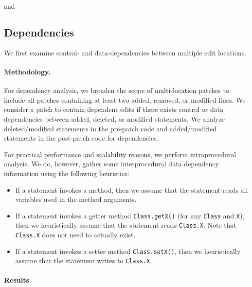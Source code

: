 \documentclass[sigconf, timestamp-false, anonymous=true]{acmart}
\begin{document}

and




\subsection{Dependencies}

We first examine control- and data-dependencies between multiple edit locations. 

\paragraph{Methodology.} 
For dependency analysis, we broaden the scope of multi-location patches to 
include all patches containing at least two added, removed, or modified lines.
We consider a patch to contain dependent edits if there exists 
control or data dependencies between added, deleted, or modified statements.
We analyze deleted/modified statements in the pre-patch code 
and added/modified statements in the post-patch code for dependencies.
  
For practical performance and scalability reasons, 
we perform intraprocedural analysis. 
We do, however, gather some interprocedural data dependency information 
using the following heuristics:
\begin{itemize}
	\item If a statement invokes a method, then we assume that
	the statement reads all variables used in the method arguments.
	\item If a statement invokes a getter method \texttt{Class.getX()} 
	(for any \texttt{Class} and \texttt{X}), then we heuristically 
	assume that the statement reads \texttt{Class.X}. 
	Note that \texttt{Class.X} does not need to actually exist.
	\item If a statement invokes a setter method \texttt{Class.setX()}, 
	then we heuristically assume that the statement writes to \texttt{Class.X}. 
\end{itemize}

\paragraph{Results}
\end{document}
